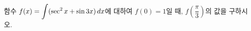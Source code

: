 함수 $f(x)=\displaystyle\int(\sec^2 x+\sin 3x)\mkern3mu dx$에 대하여 $f(0)=1$일 때, $f\!\left(\dfrac{\pi}{3}\right)$의 값을 구하시오.
